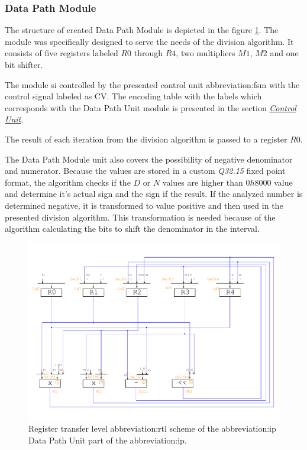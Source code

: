 \documentclass[a4paper, twoside, 11pt]{article}
\begin{document}
\subsubsection{Data Path Module}
The structure of created Data Path Module is depicted in the figure \ref{fig:division-rtl}. The module was specifically designed to serve the needs of the division algorithm. It consists of five registers labeled $R0$ through $R4$, two multipliers $M1$, $M2$ and one bit shifter.\par
The module si controlled by the presented control unit \gls{abbreviation:fsm} with the control signal labeled as CV. The encoding table with the labels which corresponds with the Data Path Unit module is presented in the section \hyperref[subsubsection:division-control-unit]{\textit{Control Unit}}.\par
The result of each iteration from the division algorithm is passed to a register $R0$.\par
The Data Path Module unit also covers the possibility of negative denominator and numerator. Because the values are stored in a custom \textit{Q32.15} fixed point format, the algorithm checks if the $D$ or $N$ values are higher than $0h8000$ value and determine it's actual sign and the sign if the result. If the analyzed number is determined negative, it is transformed to value positive and then used in the presented division algorithm. This transformation is needed because of the algorithm calculating the bits to shift the denominator in the interval.
\begin{figure}[htbp!]
  \centering
  \includegraphics[width=1\textwidth]{src/pdf/rtl.pdf}
   \caption{Register transfer level \gls{abbreviation:rtl} scheme of the \gls{abbreviation:ip} Data Path Unit part of the \gls{abbreviation:ip}.}
  \label{fig:division-rtl}
\end{figure}
\end{document}

